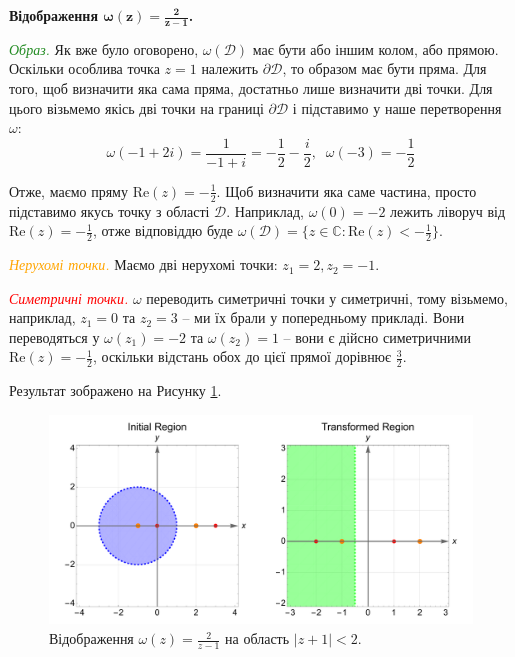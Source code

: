 \documentclass[oneside,solution]{karazin-complan-assign}
\begin{document}
\vspace{5px}
\textbf{Відображення $\boldsymbol{\omega(z)=\frac{2}{z-1}}$.}

\textcolor{ForestGreen}{\textit{Образ.}} Як вже було оговорено, $\omega(\mathcal{D})$ має бути або іншим колом, або прямою. Оскільки особлива точка $z=1$ належить $\partial\mathcal{D}$, то образом має бути пряма. Для того, щоб визначити яка сама пряма, достатньо лише визначити дві точки. Для цього візьмемо якісь дві точки на границі $\partial\mathcal{D}$ і підставимо у наше перетворення $\omega$:
\begin{equation}
    \omega(-1+2i) = \frac{1}{-1+i} = -\frac{1}{2} - \frac{i}{2}, \;\; \omega(-3) = -\frac{1}{2}
\end{equation}

Отже, маємо пряму $\text{Re}(z) = -\frac{1}{2}$. Щоб визначити яка саме частина, просто підставимо якусь точку з області $\mathcal{D}$. Наприклад, $\omega(0) = -2$ лежить ліворуч від $\text{Re}(z) = -\frac{1}{2}$, отже відповіддю буде $\omega(\mathcal{D}) = \{z \in \mathbb{C}: \text{Re}(z) < -\frac{1}{2}\}$. 

\textcolor{orange}{\textit{Нерухомі точки.}} Маємо дві нерухомі точки: $z_1=2,z_2=-1$.

\textcolor{red}{\textit{Симетричні точки.}} $\omega$ переводить симетричні точки у симетричні, тому візьмемо, наприклад, $z_1=0$ та $z_2=3$ -- ми їх брали у попередньому прикладі. Вони переводяться у $\omega(z_1)=-2$ та $\omega(z_2)=1$ -- вони є дійсно симетричними $\text{Re}(z)=-\frac{1}{2}$, оскільки відстань обох до цієї прямої дорівнює $\frac{3}{2}$.

Результат зображено на Рисунку \ref{fig:2(b)}.

\begin{figure}
    \centering
    \includegraphics[width=\textwidth]{images/hw_4/problem_2(b).pdf}
    \caption{Відображення $\omega(z)=\frac{2}{z-1}$ на область $|z+1|<2$.}
    \label{fig:2(b)}
\end{figure}
\end{document}
